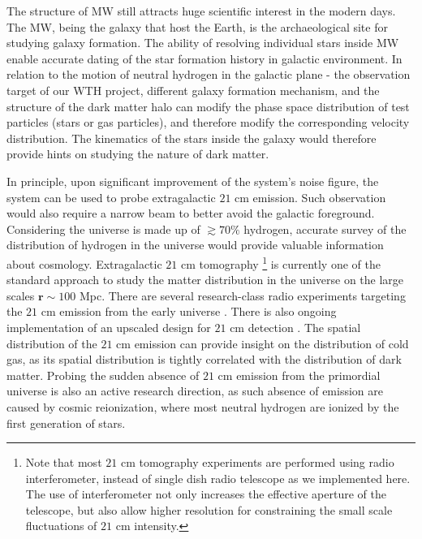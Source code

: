 \documentclass[12pt]{article}
\begin{document}
    The structure of MW still attracts huge scientific interest in the modern days. 
    The MW, being the galaxy that host the Earth, is the archaeological site for studying galaxy formation.
    The ability of resolving individual stars inside MW enable accurate dating of the star formation history in galactic environment.
    In relation to the motion of neutral hydrogen in the galactic plane - the observation target of our WTH project, different galaxy formation mechanism, and the structure of the dark matter halo can modify the phase space distribution of test particles (stars or gas particles), and therefore modify the corresponding velocity distribution.
    The kinematics of the stars inside the galaxy would therefore provide hints on studying the nature of dark matter. \cite{waveDM-compactibility-mw-satellite,wavedm-heating-dwarf,dynmaical-friction-in-waveDM-analytic,stellar-kinematics-waveDM,stellar-kinematics-dm-halo,stellar-streams-gaps-statistics-analytic}

    In principle, upon significant improvement of the system's noise figure, the system can be used to probe extragalactic $21$ cm emission.
    Such observation would also require a narrow beam to better avoid the galactic foreground.
    Considering the universe is made up of $\gtrsim 70 \%$ hydrogen, accurate survey of the distribution of hydrogen in the universe would provide valuable information about cosmology. 
    Extragalactic $21$ cm tomography%
    \footnote{Note that most $21$ cm tomography experiments are performed using radio interferometer, instead of single dish radio telescope as we implemented here. The use of interferometer not only increases the effective aperture of the telescope, but also allow higher resolution for constraining the small scale fluctuations of $21$ cm intensity.} 
    is currently one of the standard approach to study the matter distribution in the universe on the large scales $\mathbf{r} \sim 100$ Mpc. 
    There are several research-class radio experiments targeting the $21$ cm emission from the early universe \cite{chime-overview,chime-21cm-result}.
    There is also ongoing implementation of an upscaled design for $21$ cm detection \cite{chord-proposal}.
    The spatial distribution of the $21$ cm emission can provide insight on the distribution of cold gas, as its spatial distribution is tightly correlated with the distribution of dark matter. 
    Probing the sudden absence of $21$ cm emission from the primordial universe is also an active research direction, as such absence of emission are caused by cosmic reionization, where most neutral hydrogen are ionized by the first generation of stars. \cite{edge}
\end{document}
